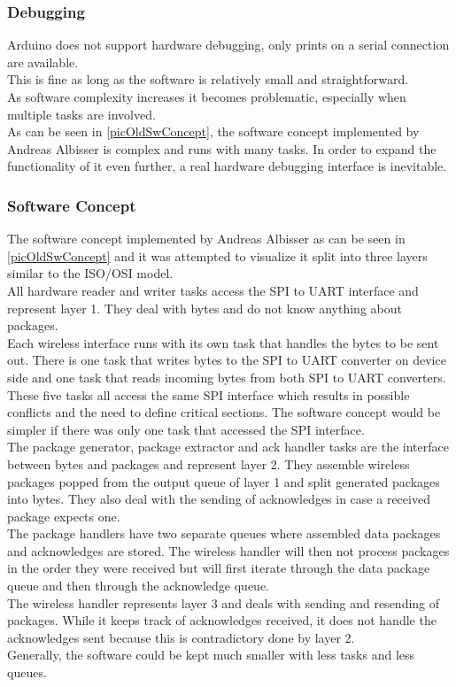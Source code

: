 \subsubsection{Debugging}
Arduino does not support hardware debugging, only prints on a serial connection are available.\\
This is fine as long as the software is relatively small and straightforward.\\
As software complexity increases it becomes problematic, especially when multiple tasks are involved.\\
As can be seen in \autoref{picOldSwConcept}, the software concept implemented by Andreas Albisser is complex and runs with many tasks. In order to expand the functionality of it even further, a real hardware debugging interface is inevitable.\\
%
\subsubsection{Software Concept}
The software concept implemented by Andreas Albisser as can be seen in \autoref{picOldSwConcept} and it was attempted to visualize it split into three layers similar to the ISO/OSI model.\\
All hardware reader and writer tasks access the SPI to UART interface and represent layer 1. They deal with bytes and do not know anything about packages.\\
Each wireless interface runs with its own task that handles the bytes to be sent out. There is one task that writes bytes to the SPI to UART converter on device side and one task that reads incoming bytes from both SPI to UART converters. These five tasks all access the same SPI interface which results in possible conflicts and the need to define critical sections. The software concept would be simpler if there was only one task that accessed the SPI interface.\\
The package generator, package extractor and ack handler tasks are the interface between bytes and packages and represent layer 2. They assemble wireless packages popped from the output queue of layer 1 and split generated packages into bytes. They also deal with the sending of acknowledges in case a received package expects one.\\
The package handlers have two separate queues where assembled data packages and acknowledges are stored. The wireless handler will then not process packages in the order they were received but will first iterate through the data package queue and then through the acknowledge queue.\\
The wireless handler represents layer 3 and deals with sending and resending of packages. While it keeps track of acknowledges received, it does not handle the acknowledges sent because this is contradictory done by layer 2.\\
Generally, the software could be kept much smaller with less tasks and less queues.\\
%
